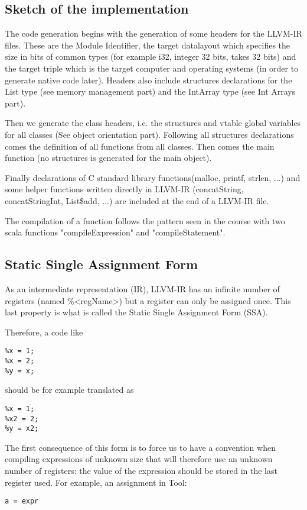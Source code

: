 \subsection{Sketch of the implementation}
The code generation begins with the generation of some headers for the LLVM-IR files. These are the Module Identifier, the target datalayout which specifies the size in bits of common types (for example i32, integer 32 bits, takes 32 bits) and the target triple which is the target computer and operating systems (in order to generate native code later). Headers also include structures declarations for the List type (see memory management part) and the IntArray type (see Int Arrays part).

Then we generate the class headers, i.e. the structures and vtable global variables for all classes (See object orientation part). Following all structures declarations comes the definition of all functions from all classes. Then comes the main function (no structures is generated for the main object).

Finally declarations of C standard library functions(malloc, printf, strlen, ...) and some helper functions written directly in LLVM-IR (concatString, concatStringInt, List\$add, ...) are included at the end of a LLVM-IR file.

The compilation of a function follows the pattern seen in the course with two scala functions "compileExpression" and "compileStatement".

\subsection{Static Single Assignment Form}
As an intermediate representation (IR), LLVM-IR has an infinite number of registers (named \%\textless regName\textgreater ) but a register can only be assigned once. This last property is what is called the Static Single Assignment Form (SSA).

Therefore, a code like
\begin{lstlisting}
%x = 1;
%x = 2;
%y = x;
\end{lstlisting}

should be for example translated as
\begin{lstlisting}
%x = 1;
%x2 = 2;
%y = x2;
\end{lstlisting}

The first consequence of this form is to force us to have a convention when compiling expressions of unknown size that will therefore use an unknown number of registers: the value of the expression should be stored in the last register used. For example, an assignment in Tool:
\begin{lstlisting}
a = expr
\end{lstlisting}

